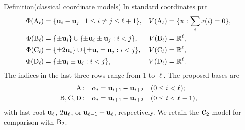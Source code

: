 \begin{namedresult}{Definition}{(classical coordinate models)}\label{def:rem-classical}
In standard coordinates put
\[
\begin{aligned}
\Phi(\mathrm{A}_\ell)&=\{{\mathbf u}_i-{\mathbf u}_j:1\leq i\ne j\leq\ell+1\},&
 V(\mathrm{A}_\ell)&=\{{\mathbf x}:\sum_i x(i)=0\},\\
\Phi(\mathrm{B}_\ell)&=\{\pm{\mathbf u}_i\}\cup\{\pm{\mathbf u}_i\pm{\mathbf u}_j:i<j\},&
 V(\mathrm{B}_\ell)&=\mathbb R^\ell,\\
\Phi(\mathrm{C}_\ell)&=\{\pm2{\mathbf u}_i\}\cup\{\pm{\mathbf u}_i\pm{\mathbf u}_j:i<j\},&
 V(\mathrm{C}_\ell)&=\mathbb R^\ell,\\
\Phi(\mathrm{D}_\ell)&=\{\pm{\mathbf u}_i\pm{\mathbf u}_j:i<j\},&
 V(\mathrm{D}_\ell)&=\mathbb R^\ell.
\end{aligned}
\]
The indices in the last three rows range from 1 to $\ell$.
The proposed bases are
\begin{equation}\label{eq:classical-bases}
\begin{aligned}
\mathrm{A}:\quad&\alpha_i={\mathbf u}_{i+1}-{\mathbf u}_{i+2}&&(0\leq i<\ell);\\
\mathrm{B},\mathrm{C},\mathrm{D}:\quad&\alpha_i={\mathbf u}_{i+1}-{\mathbf u}_{i+2}&&(0\leq i<\ell-1),
\end{aligned}
\end{equation}
with last root ${\mathbf u}_\ell$, $2{\mathbf u}_\ell$, or ${\mathbf u}_{\ell-1}+{\mathbf u}_\ell$,
respectively. We retain the $\mathrm{C}_2$ model for comparison with $\mathrm{B}_2$.
\end{namedresult}

